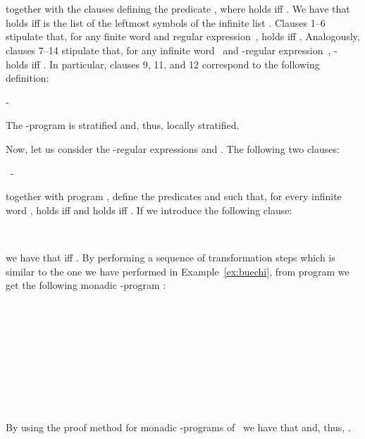 \documentclass[english]{tlp}
\begin{document}
\begin{example}
~






~

\smallskip

\noindent together with the clauses defining the predicate
, where  holds iff .
We have that  holds iff  is the list of the 
leftmost symbols of the infinite list .
Clauses 1--6 stipulate that, for any finite word  and regular expression~,
 holds iff . Analogously,
clauses 7--14 stipulate that, for any infinite word~ and
-regular expression~, \mbox{-} holds iff
. In particular, clauses 9, 11, and 12 correspond to the
following definition:

\smallskip
-

\hspace*{15mm}

\smallskip
\noindent The -program  is stratified and, thus, locally stratified.

Now, let us consider the -regular expressions  
and . The following two clauses:

\smallskip
{} ~-

\smallskip
\noindent together with program , define the predicates
 and  such that, for every
infinite word ,  holds iff  and  holds iff .
If we introduce the following clause:

\smallskip
{}~

\smallskip
\noindent 
we have that  iff .
By performing a sequence of transformation steps which is similar to the one
we have performed in Example~\ref{ex:buechi}, from program
 we get the following monadic -program :

\smallskip
{}
\,

\,

\,

\,

\,

\smallskip
\noindent By using the proof
method for monadic -programs
of~\cite{Pe&09b} we have that  and, thus, .
\end{example}
\end{document}
